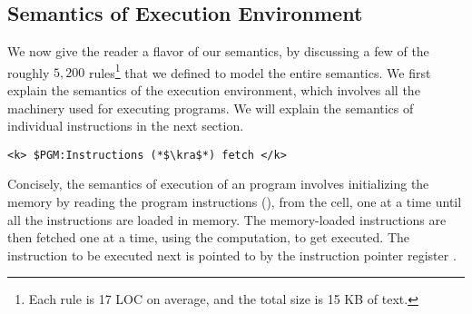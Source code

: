 \subsection{Semantics of Execution Environment}
%

We now give the reader a flavor of our semantics, by discussing a few of the roughly $5,200$ rules\footnote{Each rule is 17 LOC on average, and the total size is 15 KB of text.} that we defined to model the entire semantics.
We first explain the semantics of the execution environment, which involves all the machinery used for executing \ISA programs.
We will explain the semantics of individual instructions in the next section.

\begin{lstlisting}[style=KRULE]
<k> $PGM:Instructions (*$\kra$*) fetch </k>
\end{lstlisting}


Concisely, the semantics of execution of an \ISA program involves initializing the memory by reading the program instructions (), from the  cell, one at a time until all the instructions are loaded in memory. The memory-loaded instructions are then fetched one at a time, using the  computation, to get executed. The instruction to be executed next is pointed to by the instruction pointer register .  

